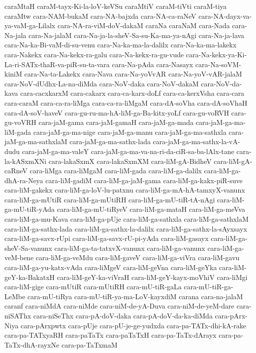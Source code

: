 {caraMtaH
caraM-tayx-Ki-la-loV-keVSu
caraMtiV
caraM-tiVti
caraM-tiya
caraMtw
cara-NAM-bukaM
cara-NA-bajxda
cara-NA-ca-raNeV
cara-NA-dayx-va-ya-vaM-ga-Lilalx
cara-NA-ra-viM-doV-dakaM
caraNa
caraNaM
cara-Nada
cara-Na-jala
cara-Na-jalaM
cara-Na-ja-la-sheV-Sa-su-Ka-ma-ya-nAgi
cara-Na-ja-lava
cara-Na-ka-Bi-vaM-di-su-venu
cara-Na-ka-ma-la-dalilx
cara-Na-ka-ma-lakekx
cara-Nakekx
cara-Na-kekx-ra-galu
cara-Na-kekx-ra-gu-vude
cara-Na-kekx-ya-Ki-La-ri-SATx-thaR-va-piR-su-ta-vara
cara-Na-pAda
cara-Nasayx
cara-Na-soVM-kiniM
cara-Na-ta-Lakekx
cara-Nava
cara-Na-yoVvAR
cara-Na-yoV-vAR-jalaM
cara-NoV-dUdhx-La-na-diMda
cara-NoV-daka
cara-NoV-dakaM
cara-NoV-da-kava
cara-cacxkarxM
cara-cakarx
cara-ca-karx-doLf
cara-ca-kerxVsha
cara-cara
cara-caraM
cara-ca-ra-liMga
cara-ca-ra-liMgaM
cara-dA-soVha
cara-dA-soVhaH
cara-dA-soV-haveV
cara-gu-ru-ma-hA-liM-ga-Ba-kitx-yoLf
cara-gu-voRVH
cara-gu-voVRH
cara-jaM-gama
cara-jaM-gamaH
cara-jaM-ga-mada
cara-jaM-ga-ma-liM-gada
cara-jaM-ga-ma-nige
cara-jaM-ga-manu
cara-jaM-ga-ma-sathxla
cara-jaM-ga-ma-sathxlaM
cara-jaM-ga-ma-sathx-lada
cara-jaM-ga-ma-sathx-la-vA-dudu
cara-jaM-ga-ma-valeY
cara-jaM-ga-ma-va-na-ri-da-ciR-sa-ba-lAlx-tane
cara-la-kASxmXNi
cara-lakaSxmX
cara-lakaSxmXM
cara-liM-gA-BidheV
cara-liM-gA-caRneV
cara-liMga
cara-liMgaM
cara-liM-gada
cara-liM-ga-dalilx
cara-liM-ga-dhA-ra-Neya
cara-liM-gadiM
cara-liM-ga-jaM-gama
cara-liM-ga-kakx-piR-suve
cara-liM-gakekx
cara-liM-ga-loV-lu-patxnu
cara-liM-ga-mA-hA-tamxyX-vanunx
cara-liM-ga-mUtiR
cara-liM-ga-mUtiRH
cara-liM-ga-mU-tiR-tA-nAgi
cara-liM-ga-mU-tiR-yAda
cara-liM-ga-mU-tiRyeV
cara-liM-ga-mataH
cara-liM-ga-meVva
cara-liM-ga-mu-Kava
cara-liM-ga-pUje
cara-liM-ga-sathxla
cara-liM-ga-sathxlaM
cara-liM-ga-sathx-lada
cara-liM-ga-sathx-la-dalilx
cara-liM-ga-sathx-la-sAyxsayx
cara-liM-ga-savx-rUpi
cara-liM-ga-savx-rU-pi-yAda
cara-liM-gasayx
cara-liM-ga-sheV-Sa-vanunx
cara-liM-ga-ta-tatxvX-vanunx
cara-liM-ga-vanunx
cara-liM-ga-veM-bene
cara-liM-ga-veMdu
cara-liM-gaveV
cara-liM-ga-viVra
cara-liM-gavu
cara-liM-ga-yu-katx-vAda
cara-liMgeV
cara-liM-geVna
cara-liM-geYka
cara-liM-geY-ka-BakatxH
cara-liM-geY-ka-viVraH
cara-liM-geY-kayx-moVhiV
cara-liMgi
cara-liM-gige
cara-mUtiR
cara-mUtiRH
cara-mU-tiR-gaLa
cara-mU-tiR-ga-LeMbe
cara-mU-tiRya
cara-mU-tiR-ya-ma-LoV-kayxdiM
carana
cara-na-jalaM
caranf
cara-niMdA
cara-niMde
cara-niM-de-yA-Duva
cara-niM-de-yeM-dare
cara-niSAThx
cara-niSeThx
cara-pA-doV-daka
cara-pA-doV-da-ka-diMda
cara-pArx-Niya
cara-pArxpwtx
cara-pUje
cara-pU-je-ge-yudxda
cara-pa-TATx-dhi-kA-rake
cara-pa-TATxyaRH
cara-paTaTx
cara-paTaTxH
cara-pa-TaTx-dArayx
cara-pa-TaTx-dhA-rayxNe
cara-pa-TaTxmaM
}
